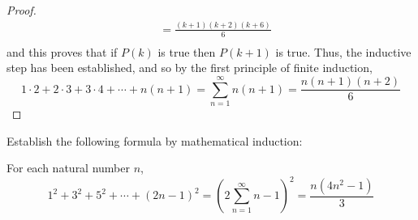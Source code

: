 \begin{example}
\begin{proof}
\begin{align*}
                    & = \frac{(k+1)(k+2)(k+6)}{6} \\
            \end{align*}
        and this proves that if $P(k)$ is true then $P(k+1)$ is true. Thus, the inductive step has been established, and so by the first principle of finite induction,
            \begin{equation*}
                {1 \cdot 2} + {2 \cdot 3} + {3 \cdot 4}  + \cdots + n(n + 1) = \sum_{n=1}^{\infty}{n(n+1)} = \frac{n(n+1)(n+2)}{6}
            \end{equation*}
    \end{proof}
\end{example}
   

\newpage
\begin{example}
Establish the following formula by mathematical induction:
    
    \begin{tcolorbox}
        \begin{theorem}
            For each natural number $n$,
                \begin{equation*}
                    1^2 + 3^2 + 5^2  + \cdots + (2n - 1)^2 = (2\sum_{n=1}^{\infty}{n} - 1)^2 = \frac{n(4n^2 - 1)}{3}
                \end{equation*}
        \end{theorem}
    \end{tcolorbox}


\end{example}
